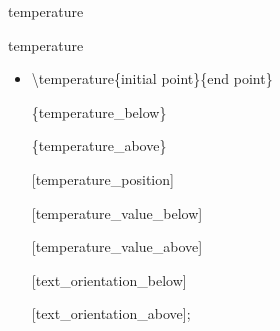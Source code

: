 \documentclass[ aspectratio=169,  12pt,blue,xcolor=pdftex,dvipsnames,table,handout,notes]{beamer}
\begin{document}
		\begin{frame}[t]{temperature}
 
			\begin{block}{temperature}
			\begin{itemize}
			\item[] 	\textbackslash temperature\{initial point\}\{end point\}
					\par \hspace{2cm}\{temperature\_below\}
					\par \hspace{2cm}\{temperature\_above\}
					\par \hspace{2cm}[temperature\_position]
					\par \hspace{2cm}[temperature\_value\_below]
					\par \hspace{2cm}[temperature\_value\_above]
					\par \hspace{2cm}[text\_orientation\_below]
					\par \hspace{2cm}[text\_orientation\_above];
			\end{itemize}
			\end{block}


		\end{frame}

\end{document}
